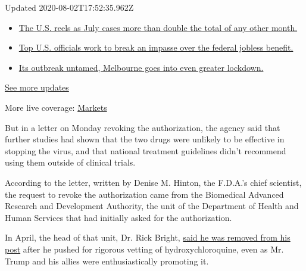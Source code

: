 Updated 2020-08-02T17:52:35.962Z

\begin{itemize}
\tightlist
\item
  \href{https://www.nytimes3xbfgragh.onion/2020/08/01/world/coronavirus-covid-19.html?action=click\&pgtype=Article\&state=default\&region=MAIN_CONTENT_1\&context=storylines_live_updates\#link-34047410}{The
  U.S. reels as July cases more than double the total of any other
  month.}
\item
  \href{https://www.nytimes3xbfgragh.onion/2020/08/01/world/coronavirus-covid-19.html?action=click\&pgtype=Article\&state=default\&region=MAIN_CONTENT_1\&context=storylines_live_updates\#link-780ec966}{Top
  U.S. officials work to break an impasse over the federal jobless
  benefit.}
\item
  \href{https://www.nytimes3xbfgragh.onion/2020/08/01/world/coronavirus-covid-19.html?action=click\&pgtype=Article\&state=default\&region=MAIN_CONTENT_1\&context=storylines_live_updates\#link-2bc8948}{Its
  outbreak untamed, Melbourne goes into even greater lockdown.}
\end{itemize}

\href{https://www.nytimes3xbfgragh.onion/2020/08/01/world/coronavirus-covid-19.html?action=click\&pgtype=Article\&state=default\&region=MAIN_CONTENT_1\&context=storylines_live_updates}{See
more updates}

More live coverage:
\href{https://www.nytimes3xbfgragh.onion/live/2020/07/31/business/stock-market-today-coronavirus?action=click\&pgtype=Article\&state=default\&region=MAIN_CONTENT_1\&context=storylines_live_updates}{Markets}

But in a letter on Monday revoking the authorization, the agency said
that further studies had shown that the two drugs were unlikely to be
effective in stopping the virus, and that national treatment guidelines
didn't recommend using them outside of clinical trials.

According to the letter, written by Denise M. Hinton, the F.D.A.'s chief
scientist, the request to revoke the authorization came from the
Biomedical Advanced Research and Development Authority, the unit of the
Department of Health and Human Services that had initially asked for the
authorization.

In April, the head of that unit, Dr. Rick Bright,
\href{https://www.nytimes3xbfgragh.onion/2020/04/22/us/politics/rick-bright-trump-hydroxychloroquine-coronavirus.html}{said
he was removed from his post} after he pushed for rigorous vetting of
hydroxychloroquine, even as Mr. Trump and his allies were
enthusiastically promoting it.


